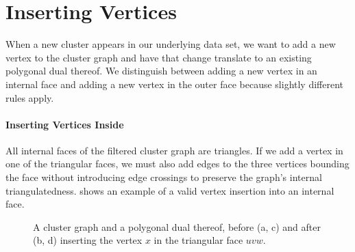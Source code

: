 \section{Inserting Vertices}
\label{sect:inserting-vertices}

When a new cluster appears in our underlying data set, we want to add a new vertex to the cluster graph and have that change translate to an existing polygonal dual thereof.
We distinguish between adding a new vertex in an internal face and adding a new vertex in the outer face because slightly different rules apply.



\paragraph{Inserting Vertices Inside}

All internal faces of the filtered cluster graph  are triangles.
If we add a vertex in one of the triangular faces, we must also add edges to the three vertices bounding the face without introducing edge crossings to preserve the graph's internal triangulatedness.
 shows an example of a valid vertex insertion into an internal face.

\begin{figure}[H]
	\centering
	\quad
	\qquad
	\quad
	\caption{A cluster graph and a polygonal dual thereof, before (a, c) and after (b, d) inserting the vertex $x$ in the triangular face $uvw$.}
	\label{fig:insert-vertex-example-inside}
\end{figure}

